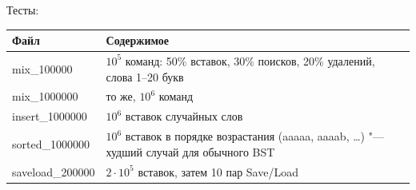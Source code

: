 Тесты:
\begin{longtable}{|l|p{11cm}|}
\hline
\rowcolor{lightgray}
Файл & Содержимое\\
\hline
{\ttfamily mix\_100000} & $10^5$ команд: 50\% вставок, 30\% поисков, 20\% удалений, слова 1--20 букв\\
\hline
{\ttfamily mix\_1000000} & то же, $10^6$ команд\\
\hline
{\ttfamily insert\_1000000} & $10^6$ вставок случайных слов\\
\hline
{\ttfamily sorted\_1000000} & $10^6$ вставок в порядке возрастания ({\ttfamily aaaaa}, {\ttfamily aaaab}, \ldots) "--- худший случай для обычного BST\\
\hline
{\ttfamily saveload\_200000} & $2\cdot10^5$ вставок, затем 10 пар {\ttfamily Save}/{\ttfamily Load}\\
\hline
\end{longtable}
\pagebreak
